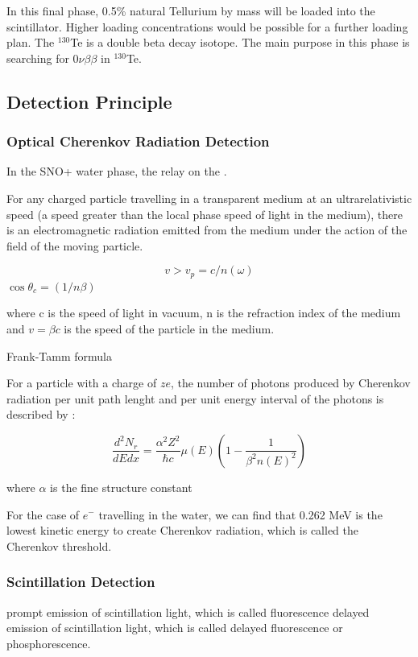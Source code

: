 In this final phase, 0.5\% natural Tellurium by mass will be loaded into the scintillator.
Higher loading concentrations would be possible for a further loading plan\cite{Paton:2019kgy}.
 The $^{130}$Te is a double beta decay isotope. The main purpose in this phase is searching for $0\nu\beta\beta$ in $^{130}$Te.


\subsection{Detection Principle}

\subsubsection{Optical Cherenkov Radiation Detection}
In the SNO+ water phase, the relay on the .

For any charged particle travelling in a transparent medium at an ultrarelativistic speed (a speed greater than the local phase speed of light in the medium), there is an electromagnetic radiation emitted from the medium under the action of the field of the moving particle\cite{landau2013electrodynamics}.


\[v>v_p=c/n(\omega)\]   $\cos\theta_c = (1/n\beta)$


where c is the speed of light in vacuum, n is the refraction index of the medium and $v=\beta c$ is the speed of the particle in the medium.


Frank-Tamm formula

For a particle with a charge of $ze$, the number of photons produced by Cherenkov radiation per unit path lenght and per unit energy interval of the photons is described by :
 
\[
\frac{d^2N_r}{dEdx}=\frac{\alpha^2 Z^2}{\hbar c}\mu(E)(1-\frac{1}{\beta^2 n(E)^2})
\]

where $\alpha$ is the fine structure constant



For the case of $e^-$ travelling in the water, we can find that 0.262 MeV is the lowest kinetic energy to create Cherenkov radiation, which is called the Cherenkov threshold.

\subsubsection{Scintillation Detection}

prompt emission of scintillation light, which is called fluorescence
delayed emission of scintillation light, which is called delayed fluorescence or phosphorescence.

